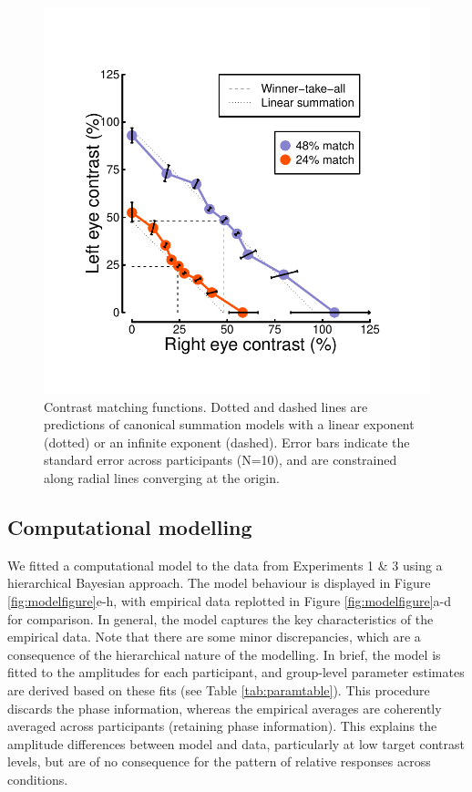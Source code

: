 \documentclass[
]{article}
\begin{document}
\begin{figure}

{\centering \includegraphics[width=0.5\linewidth]{Figures/matchingdata} 

}

\caption{Contrast matching functions. Dotted and dashed lines are predictions of canonical summation models with a linear exponent (dotted) or an infinite exponent (dashed). Error bars indicate the standard error across participants (N=10), and are constrained along radial lines converging at the origin.}\label{fig:matchingdata}
\end{figure}

\hypertarget{computational-modelling}{%
\subsection{Computational modelling}\label{computational-modelling}}

We fitted a computational model to the data from Experiments 1 \& 3 using a hierarchical Bayesian approach. The model behaviour is displayed in Figure \ref{fig:modelfigure}e-h, with empirical data replotted in Figure \ref{fig:modelfigure}a-d for comparison. In general, the model captures the key characteristics of the empirical data. Note that there are some minor discrepancies, which are a consequence of the hierarchical nature of the modelling. In brief, the model is fitted to the amplitudes for each participant, and group-level parameter estimates are derived based on these fits (see Table \ref{tab:paramtable}). This procedure discards the phase information, whereas the empirical averages are coherently averaged across participants (retaining phase information). This explains the amplitude differences between model and data, particularly at low target contrast levels, but are of no consequence for the pattern of relative responses across conditions.
\end{document}
